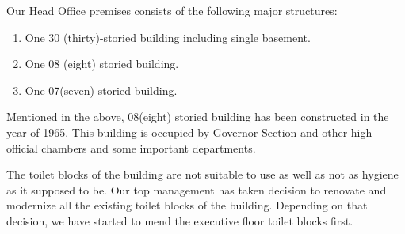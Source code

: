 \documentclass[11pt,a4paper]{article}
\begin{document}
		
		Our Head Office premises consists of the following major structures:
		\begin{enumerate}
			\item 	One 30 (thirty)-storied building including single basement.
			\item	One 08 (eight) storied building.
			\item	One 07(seven) storied building.
		\end{enumerate}
	
		Mentioned in the above, 08(eight) storied building has been constructed in the year of 1965. This building is occupied by Governor Section and other high official chambers and some important departments.
		
		The toilet blocks of the building are not suitable to use as well as not as hygiene as it supposed to be. Our top management has taken decision to renovate and modernize all the existing toilet blocks of the building. Depending on that decision, we have started to mend the executive floor toilet blocks first.\\[2ex]
		
\end{document}
